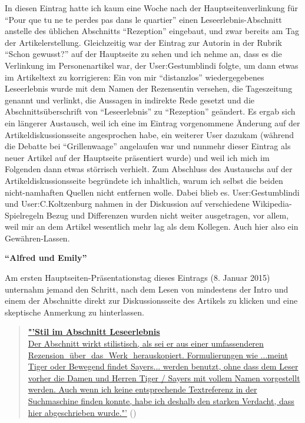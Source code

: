 \documentclass[fontsize=12pt]{scrartcl}
\begin{document}
In diesen Eintrag hatte ich kaum eine Woche nach der Hauptsei\-tenverlinkung f\"ur "`Pour que tu ne te perdes pas dans le quartier"' einen Leseerlebnis-Abschnitt anstelle des \"ublichen Abschnitts "`Rezeption"' eingebaut, und zwar bereits am Tag der Artikelerstellung. Gleichzeitig war der Eintrag zur Autorin\textsuperscript{\tiny *} in der Rubrik "`Schon gewusst?"' auf der Hauptseite zu sehen und ich nehme an, dass es die Verlinkung im Per\-so\-nenartikel war, der \mbox{User}:Ges\-tum\-blin\-di folgte, um dann etwas im Artikeltext zu korrigieren: Ein von mir "`distanzlos"' wiedergegebenes Leseerlebnis wurde mit dem Namen der Rezensentin versehen, die Tageszeitung genannt und verlinkt, die Aussagen in indirekte Rede gesetzt und die Abschnitts\"uberschrift von "`Leseerlebnis"' zu "`Rezeption"' ge\"andert. Es ergab sich ein l\"angerer Austausch, weil ich eine im Eintrag vorgenommene \"Anderung auf der Artikeldis\-kus\-si\-onsseite an\-ge\-spro\-chen habe, ein weiterer \mbox{User} dazukam (w\"ahrend die Debatte bei "`Grillenwaage"' angelaufen war und nunmehr dieser Eintrag als neuer Artikel auf der Hauptseite pr\"asentiert wurde) und weil ich mich im Folgenden dann etwas st\"orrisch verhielt. Zum Abschluss des Austauschs auf der Artikeldis\-kus\-si\-onsseite begr\"undete ich inhaltlich, warum ich \mbox{selbst} die beiden nicht-namhaften Quellen nicht entfernen wolle. Dabei blieb es. \mbox{User}:Ges\-tum\-blin\-di und \mbox{User}:C.Kolt\-zen\-burg nahmen in der Dis\-kus\-si\-on auf verschiedene Wi\-ki\-pe\-dia-Spielregeln Bezug und Differenzen wurden nicht weiter ausgetragen, vor allem, weil mir an dem Artikel we\-sent\-lich mehr lag als dem Kollegen\textsuperscript{\tiny *}. Auch \mbox{hier} also ein Gew\"ahren-Lassen.\newline

\textbf{"`Alfred und Emily"'}

Am ersten Hauptsei\-ten-Pr\"asentationstag dieses Eintrags (8. Januar 2015) unternahm jemand den Schritt, nach dem Lesen von mindestens der Intro und einem der Abschnitte direkt zur Dis\-kus\-si\-onsseite des Artikels zu klicken und eine skeptische Anmerkung zu hinterlassen. 

\singlespacing
\begin{quote}
\href{https://de.wikipedia.org/w/index.php?title=Diskussion:Alfred_und_Emily\&oldid=137566068}{\textbf{"'Stil im Abschnitt \flq Leseerlebnis\frq}\\
Der Abschnitt wirkt stilistisch, als sei er aus einer umfassenderen Rezension \,\,\"uber \,\,das \,\,Werk \,\,he\-rauskopiert. Formulierungen wie \flq ...meint Ti\-ger\frq \,\,oder \flq Bewegend findet Sayers...\frq \,\,werden benutzt, ohne dass dem Leser vorher die Damen und Herren Tiger / Sayers mit vollem Namen vor\-ge\-stellt werden. Auch wenn ich keine entsprechende Textreferenz in der Such\-ma\-schi\-ne finden konnte, habe ich deshalb den starken Verdacht, dass hier abgeschrieben wurde."'} (\cite{User80.156.174.352015})
\end{quote}
\onehalfspacing
\end{document}
